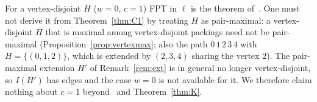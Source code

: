 \begin{remark}[Vertex-disjoint packings and the case $c=1$]\label{rem:c1}
For a vertex-disjoint $H$ ($w=0$, $c=1$) FPT in $\ell$ is the theorem of~\cite{BFK18}. One must not derive it from Theorem~\ref{thm:C1} by treating $H$ as pair-maximal: a vertex-disjoint $H$ that is maximal among vertex-disjoint packings need not be pair-maximal (Proposition~\ref{prop:vertexmax}; also the path $0\,1\,2\,3\,4$ with $H=\{(0,1,2)\}$, which is extended by $(2,3,4)$ sharing the vertex $2$). The pair-maximal extension $H'$ of Remark~\ref{rem:ext} is in general no longer vertex-disjoint, so $I(H')$ has edges and the case $w=0$ is not available for it. We therefore claim nothing about $c=1$ beyond~\cite{BFK18} and Theorem~\ref{thm:K}.
\end{remark}
